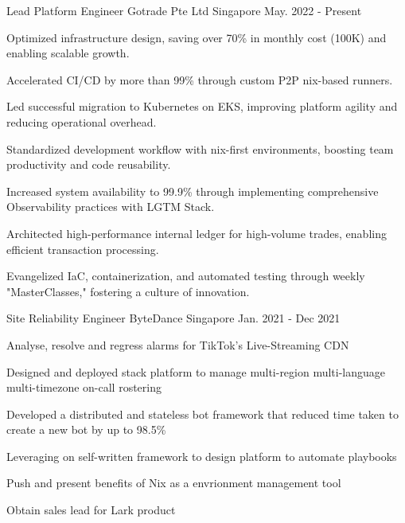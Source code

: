

\begin{cventries}


    \cventry
    {Lead Platform Engineer} %
    {Gotrade Pte Ltd} %
    {Singapore} %
    {May. 2022 - Present} %
    {
    \begin{cvitems} %
        \item {Optimized infrastructure design, saving over 70\% in monthly cost (100K) and enabling scalable growth.}
        \item {Accelerated CI/CD by more than 99\% through custom P2P nix-based runners.}
        \item {Led successful migration to Kubernetes on EKS, improving platform agility and reducing operational overhead.}
        \item {Standardized development workflow with nix-first environments, boosting team productivity and code reusability.}
        \item {Increased system availability to 99.9\% through implementing comprehensive Observability practices with LGTM Stack.}
        \item {Architected high-performance internal ledger for high-volume trades, enabling efficient transaction processing.}
        \item {Evangelized IaC, containerization, and automated testing through weekly "MasterClasses," fostering a culture of innovation.}
    \end{cvitems}
    }

    \cventry
    {Site Reliability Engineer} %
    {ByteDance} %
    {Singapore} %
    {Jan. 2021 - Dec 2021} %
    {
    \begin{cvitems} %
        \item {Analyse, resolve and regress alarms for TikTok's Live-Streaming CDN}
        \item {Designed and deployed stack platform to manage multi-region multi-language multi-timezone on-call rostering}
        \item {Developed a distributed and stateless bot framework that reduced time taken to create a new bot by up to 98.5\%}
        \item {Leveraging on self-written framework to design platform to automate playbooks}
        \item {Push and present benefits of Nix as a envrionment management tool}
        \item {Obtain sales lead for Lark product}
    \end{cvitems}
    }


\end{cventries}
